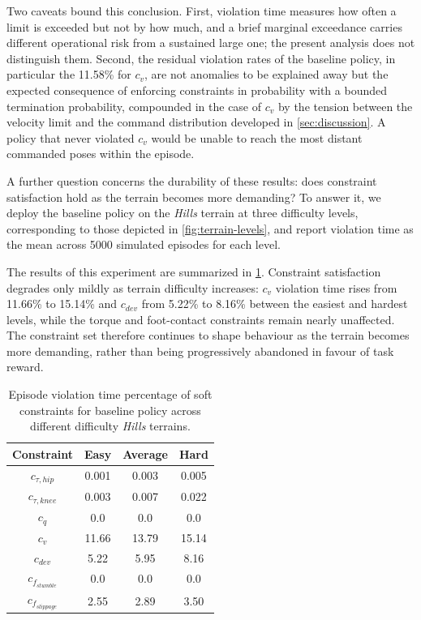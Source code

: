 Two caveats bound this conclusion. First, violation time measures how often a limit is exceeded but not by how much, and a brief marginal exceedance carries different operational risk from a sustained large one; the present analysis does not distinguish them. Second, the residual violation rates of the baseline policy, in particular the 11.58\% for $c_v$, are not anomalies to be explained away but the expected consequence of enforcing constraints in probability with a bounded termination probability, compounded in the case of $c_v$ by the tension between the velocity limit and the command distribution developed in \cref{sec:discussion}. A policy that never violated $c_v$ would be unable to reach the most distant commanded poses within the episode.

A further question concerns the durability of these results: does constraint
satisfaction hold as the terrain becomes more demanding? To answer it, we deploy the
baseline policy on the \textit{Hills} terrain at three difficulty levels, corresponding
to those depicted in \cref{fig:terrain-levels}, and report violation time as the mean
across 5000 simulated episodes for each level.

The results of this experiment are summarized in \cref{tab:constraint-terrains}. Constraint satisfaction degrades only mildly as terrain difficulty increases: $c_v$ violation time rises from 11.66\% to 15.14\% and $c_{dev}$ from 5.22\% to 8.16\% between the easiest and hardest levels, while the torque and foot-contact constraints remain nearly unaffected. The constraint set therefore continues to shape behaviour as the terrain becomes more demanding, rather than being progressively abandoned in favour of task reward.

\begin{table}[width=\columnwidth,cols=4]
    \centering
    \caption{Episode violation time percentage of soft constraints for baseline policy across different difficulty \textit{Hills} terrains. }
    \renewcommand{\arraystretch}{1.3} %
    \begin{tabular}{c c c c} 
        \toprule
        \textbf{Constraint} & \textbf{Easy} & \textbf{Average} & \textbf{Hard} \\
        \midrule
        $c_{\tau,hip}$    & 0.001   & 0.003 & 0.005   \\
        $c_{\tau,knee}$   & 0.003   & 0.007 & 0.022 \\
        $c_{\dot{q}}$     & 0.0   & 0.0     & 0.0    \\
        $c_v$             & 11.66  & 13.79   & 15.14  \\
        $c_{dev}$         & 5.22   & 5.95 & 8.16  \\
        $c_{f_{stumble}}$ & 0.0      & 0.0     & 0.0   \\
        $c_{f_{slippage}}$ & 2.55  & 2.89  & 3.50  \\
        \bottomrule
    \end{tabular}
    \label{tab:constraint-terrains}
\end{table}